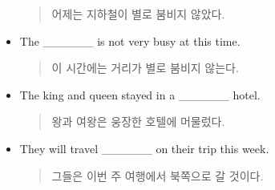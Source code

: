 \documentclass{article}
\begin{document}
\begin{addmargin}[1em]{1em}
\begin{itemize}
\begin{quote}
    어제는 지하철이 별로 붐비지 않았다.
    \end{quote}
    \item The \_\_\_\_\_\_ is not very busy at this time.
    \begin{quote}
    이 시간에는 거리가 별로 붐비지 않는다.
    \end{quote}
    \item The king and queen stayed in a \_\_\_\_\_\_ hotel.
    \begin{quote}
    왕과 여왕은 웅장한 호텔에 머물렀다.
    \end{quote}
    \item They will travel \_\_\_\_\_\_ on their trip this week.
    \begin{quote}
    그들은 이번 주 여행에서 북쪽으로 갈 것이다.
    \end{quote}

\end{itemize}
\end{addmargin}
\end{document}

